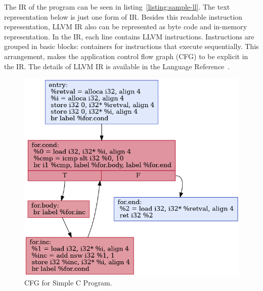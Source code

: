 
The IR of the program can be seen in listing~\ref{listing:sample-ll}. The text
representation below is just one form of IR. Besides this readable instruction
representation, LLVM IR also can be represented as byte code and in-memory
representation. In the IR, each line contains LLVM instructions. Instructions
are grouped in basic blocks: containers for instructions that execute
sequentially. This arrangement, makes the application control flow graph (CFG)
to be explicit in the IR. The details of LLVM IR is available in the Language
Reference~\cite{LLVMLanguageReferencea}.



\begin{figure}[ht]
    \centerline{\includegraphics[scale=.75]{Figures/03/cfg.png}}
    \caption{CFG for Simple C Program.}
    \label{fig:cfg}
\end{figure}


